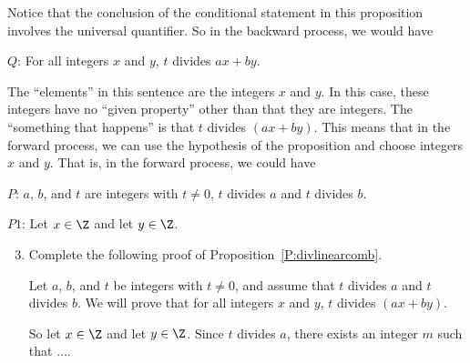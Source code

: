 \begin{enumerate}
Notice that the conclusion of the conditional statement in this proposition involves the universal quantifier.  So in the backward process, we would have
\begin{list}{}
\item $Q$:	For all integers  $x$  and  $y$, $t$  divides  $ax + by$.
\end{list}
\vskip10pt
%
The ``elements'' in this sentence are the integers  $x$  and  $y$.  In this case, these integers have no ``given property'' other than that they are integers.  The ``something that happens'' is that 
$t$  divides  $\left(ax + by\right)$.  
%
This means that in the forward process, we can use the hypothesis of the proposition and choose integers  $x$  and  $y$.  That is, in the forward process, we could have
\begin{list}{}
\item $P$:	$a$, $b$, and  $t$  are integers with $t \ne 0$, $t$  divides  $a$  and  $t$  divides  $b$.
\item $P1$:	Let  $x \in \Z$ and let  $y \in \Z$.
\end{list}
\vskip10pt
%
\begin{enumerate} \setcounter{enumii}{2}
\item Complete the following proof of Proposition~\ref{P:divlinearcomb}.
%
%
\begin{myproof}
Let $a$, $b$, and  $t$  be integers with $t \ne 0$, and assume that $t$  divides  $a$  and  $t$  divides  $b$.  We will prove that for all integers  $x$  and  $y$,  $t$  divides  
$\left(ax + by\right)$.

So let  $x \in \Z$ and let  $y \in \Z$.  Since  $t$  divides  $a$, there exists an integer  $m$  such that $ \ldots .$
\end{myproof}
\end{enumerate}
\end{enumerate}

\hbreak

\endinput

